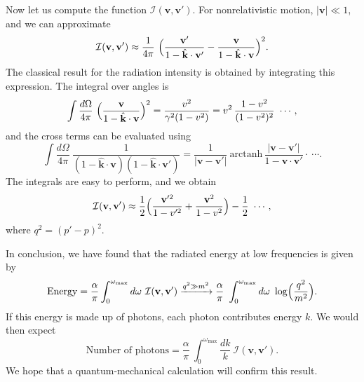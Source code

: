 Now let us compute the function $\mathcal{I}(\mathbf{v},\mathbf{v}')$.
For nonrelativistic motion, $|\mathbf{v}| \ll 1$, and we can approximate
\begin{equation}
  \mathcal{I}(\mathbf{v},\mathbf{v}') \approx
    \frac{1}{4\pi}\ \Bigl( \frac{\mathbf{v}'}{1 - \hat{\mathbf{k}}\cdot\mathbf{v}'}
      - \frac{\mathbf{v}}{1 - \hat{\mathbf{k}}\cdot\mathbf{v}} \Bigr)^2 .
  \label{eq:6.13}
\end{equation}
The classical result for the radiation intensity is obtained by integrating
this expression.  The integral over angles is
\begin{equation}
  \int \frac{d\Omega}{4\pi}\ \Bigl( \frac{\mathbf{v}}{1-\hat{\mathbf{k}}\cdot\mathbf{v}}
    \Bigr)^2 = \frac{v^2}{\gamma^2(1-v^2)}
    = v^2\,\frac{1-v^2}{(1-v^2)^2}\ \cdots ,
\end{equation}
and the cross terms can be evaluated using
\begin{equation}
  \int \frac{d\Omega}{4\pi}\ \frac{1}{(1-\hat{\mathbf{k}}\cdot\mathbf{v})
    (1-\hat{\mathbf{k}}\cdot\mathbf{v}')}
  = \frac{1}{|\mathbf{v}-\mathbf{v}'|}\ \mathrm{arctanh}\,
    \frac{|\mathbf{v}-\mathbf{v}'|}{1 - \mathbf{v}\cdot\mathbf{v}'}
    \cdot\ \cdots .
  \label{eq:6.16}
\end{equation}
The integrals are easy to perform, and we obtain
\begin{equation}
  \mathcal{I}(\mathbf{v},\mathbf{v}') \approx
    \frac{1}{2}\Bigl( \frac{\mathbf{v}'^2}{1-v'^2} + \frac{\mathbf{v}^2}{1-v^2}
      \Bigr) - \frac{1}{2}\ \cdots ,
  \label{eq:6.17}
\end{equation}
where $q^2 = (p'-p)^2$.

In conclusion, we have found that the radiated energy at low frequencies is
given by
\begin{equation}
  \text{Energy} = \frac{\alpha}{\pi}\int_0^{\omega_{\mathrm{max}}}
    d\omega\ \mathcal{I}(\mathbf{v},\mathbf{v}')
  \xrightarrow{q^2 \gg m^2}
  \frac{\alpha}{\pi}\ \int_0^{\omega_{\mathrm{max}}} d\omega\
    \log\Bigl( \frac{q^2}{m^2} \Bigr).
  \label{eq:6.18}
\end{equation}
If this energy is made up of photons, each photon contributes energy $k$.  We
would then expect
\begin{equation}
  \text{Number of photons} = \frac{\alpha}{\pi}\ \int_0^{\omega_{\mathrm{max}}}
    \frac{dk}{k}\ \mathcal{I}(\mathbf{v},\mathbf{v}') .
  \label{eq:6.19}
\end{equation}
We hope that a quantum-mechanical calculation will confirm this result.

